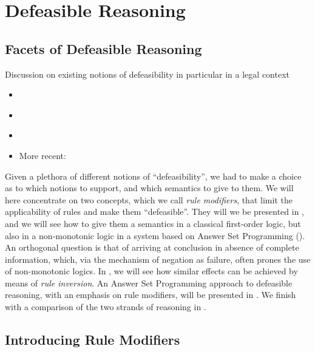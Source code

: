 \section{Defeasible Reasoning}\label{sec:defeasible}

\subsection{Facets of Defeasible Reasoning}\label{sec:facets}

\begin{tcolorbox}[title=To be done]
Discussion on existing notions of defeasibility in particular in a legal context
\begin{itemize}
\item \cite{hart_concept_of_law_1997}
\item \cite{alchourron_makinson_hierarchies_of_regulations_1981}
\item \cite{hage_law_and_defeasibility_2003}
\item More recent: \cite{governatori21:_unrav_legal_refer_defeas_deont_logic}
\end{itemize}
\end{tcolorbox}

Given a plethora of different notions of ``defeasibility'', we had to make a
choice as to which notions to support, and which semantics to give to them. We
will here concentrate on two concepts, which we call \emph{rule modifiers},
that limit the applicability of rules and make them ``defeasible''. They will
we be presented in , and we will see how to give
them a semantics in a classical first-order logic, but also in a non-monotonic
logic in a system based on Answer Set Programming
(). An orthogonal question is that of
arriving at conclusion in absence of complete information, which, via the
mechanism of negation as  failure, often prones the use of
non-monotonic logics. In , we will see how similar
effects can be achieved by means of \emph{rule inversion}. An Answer Set
Programming approach to defeasible reasoning, with an emphasis on rule
modifiers, will be presented in . We finish
with a comparison of the two strands of reasoning in .


\subsection{Introducing Rule Modifiers}\label{sec:intro_rule_modifiers}

